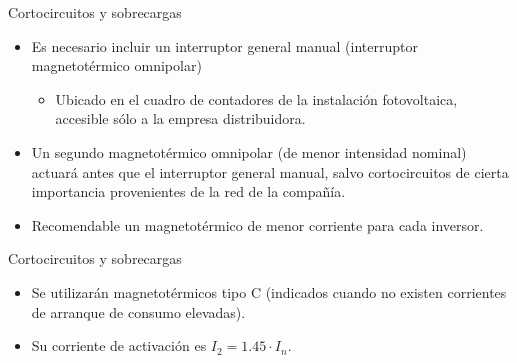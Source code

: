 \documentclass[xcolor={usenames,svgnames,dvipsnames}]{beamer}
\begin{document}
\begin{frame}[label={sec:org07b4bf2}]{Cortocircuitos y sobrecargas}
\begin{itemize}
\item Es necesario incluir un \alert{interruptor general manual} (interruptor
magnetotérmico omnipolar)

\begin{itemize}
\item Ubicado en el cuadro de contadores de la instalación fotovoltaica,
\alert{accesible sólo a la empresa distribuidora}.
\end{itemize}

\item Un \alert{segundo magnetotérmico omnipolar} (de menor intensidad nominal)
actuará antes que el interruptor general manual, salvo
cortocircuitos de cierta importancia provenientes de la red de la
compañía.

\item Recomendable un magnetotérmico de menor corriente para cada
inversor.
\end{itemize}
\end{frame}

\begin{frame}[label={sec:orgbc2ead4}]{Cortocircuitos y sobrecargas}
\begin{itemize}
\item Se utilizarán \alert{magnetotérmicos tipo C} (indicados cuando no existen corrientes de arranque de consumo elevadas).

\item Su corriente de activación es \(I_{2}=1.45\cdot I_{n}\).
\end{itemize}
\end{frame}
\end{document}
